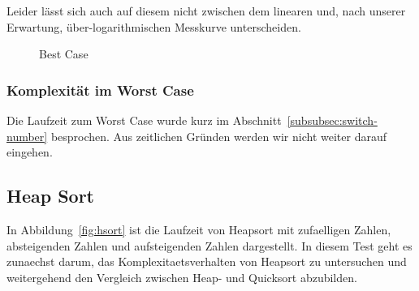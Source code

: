 Leider lässt sich auch auf diesem nicht zwischen dem linearen und, nach
unserer Erwartung, über-logarithmischen Messkurve unterscheiden.

\begin{figure}[hbt]
    \centering
    \caption{Best Case}
\end{figure}

\subsubsection{Komplexität im Worst Case}\label{subsubsec:worst-case}
Die Laufzeit zum Worst Case wurde kurz im
Abschnitt~\ref{subsubsec:switch-number} besprochen.
Aus zeitlichen Gründen werden wir nicht weiter darauf eingehen.


\FloatBarrier

\subsection{Heap Sort}\label{subsec:heap-sort-laufzeit}

In Abbildung~\ref{fig:hsort} ist die Laufzeit von Heapsort mit zufaelligen Zahlen, absteigenden Zahlen und aufsteigenden Zahlen dargestellt.
In diesem Test geht es zunaechst darum, das Komplexitaetsverhalten von Heapsort zu untersuchen und weitergehend den Vergleich zwischen Heap- und Quicksort abzubilden. 

